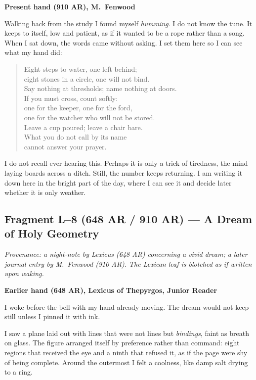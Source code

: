 \documentclass[11pt]{article}
\begin{document}
\medskip
\noindent\textbf{Present hand (910 AR), M.\ Fenwood}

Walking back from the study I found myself \emph{humming}. I do not know the tune. It keeps to itself, low and patient, as if it wanted to be a rope rather than a song. When I sat down, the words came without asking. I set them here so I can see what my hand did:

\begin{verse}
Eight steps to water, one left behind;\\
eight stones in a circle, one will not bind.\\
Say nothing at thresholds; name nothing at doors.\\
If you must cross, count softly:\\
one for the keeper, one for the ford,\\
one for the watcher who will not be stored.\\
Leave a cup poured; leave a chair bare.\\
What you do not call by its name\\
cannot answer your prayer.
\end{verse}

I do not recall ever hearing this. Perhaps it is only a trick of tiredness, the mind laying boards across a ditch. Still, the number keeps returning. I am writing it down here in the bright part of the day, where I can see it and decide later whether it is only weather.

\subsection*{Fragment L--8 (648 AR / 910 AR) --- A Dream of Holy Geometry}
\label{frag:l8}
{}

\noindent\textit{Provenance: a night-note by Lexicus (648 AR) concerning a vivid dream; a later journal entry by M.\ Fenwood (910 AR). The Lexican leaf is blotched as if written upon waking.}

\medskip
\noindent\textbf{Earlier hand (648 AR), Lexicus of Thepyrgos, Junior Reader}

I woke before the bell with my hand already moving. The dream would not keep still unless I pinned it with ink.

I saw a plane laid out with lines that were not lines but \emph{bindings}, faint as breath on glass. The figure arranged itself by preference rather than command: eight regions that received the eye and a ninth that refused it, as if the page were shy of being complete. Around the outermost I felt a coolness, like damp salt drying to a ring.
\end{document}
